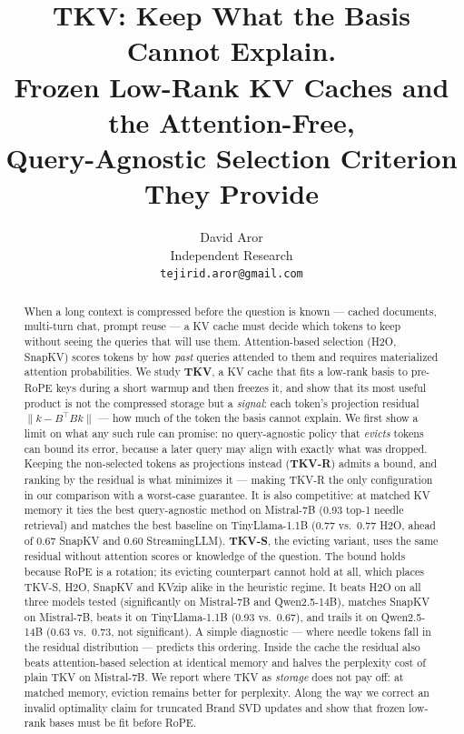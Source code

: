 \documentclass{article}
\title{\textbf{TKV: Keep What the Basis Cannot Explain.\\
Frozen Low-Rank KV Caches and the Attention-Free,\\
Query-Agnostic Selection Criterion They Provide}}
\author{
  David Aror \\
  Independent Research \\
  \texttt{tejirid.aror@gmail.com}
}
\date{}
\begin{document}
\ifcolmsubmission
\linenumbers
\fi

\maketitle

\begin{abstract}
When a long context is compressed before the question is known --- cached
documents, multi-turn chat, prompt reuse --- a KV cache must decide which
tokens to keep without seeing the queries that will use them. Attention-based
selection (H2O, SnapKV) scores tokens by how \emph{past} queries attended to
them and requires materialized attention probabilities. We study \textbf{TKV}, a KV cache that fits a low-rank basis to pre-RoPE keys
during a short warmup and then freezes it, and show that its most useful
product is not the compressed storage but a \emph{signal}: each token's
projection residual $\lVert k - B^\top B k\rVert$ --- how much of the token the
basis cannot explain. We first show a limit on what any such rule can promise:
no query-agnostic policy that \emph{evicts} tokens can bound its error, because
a later query may align with exactly what was dropped. Keeping the
non-selected tokens as projections instead (\textbf{TKV-R}) admits a bound, and
ranking by the residual is what minimizes it --- making TKV-R the only
configuration in our comparison with a worst-case guarantee. It is also
competitive: at matched KV memory it ties the best query-agnostic method on
Mistral-7B (0.93 top-1 needle retrieval) and matches the best baseline on
TinyLlama-1.1B (0.77 vs.\ 0.77 H2O, ahead of 0.67 SnapKV and 0.60 StreamingLLM).
\textbf{TKV-S}, the evicting variant, uses the same residual without attention
scores or knowledge of the question. The bound holds because RoPE is a rotation; its evicting counterpart cannot
hold at all, which places TKV-S, H2O, SnapKV and KVzip alike in the heuristic
regime. It beats H2O on all three models tested (significantly on Mistral-7B and
Qwen2.5-14B), matches SnapKV on Mistral-7B, beats it on TinyLlama-1.1B (0.93
vs.\ 0.67), and trails it on Qwen2.5-14B (0.63 vs.\ 0.73, not significant).
A simple diagnostic --- where needle tokens fall in the residual distribution
--- predicts this ordering. Inside the cache the residual also beats attention-based selection at identical
memory and halves the perplexity cost of plain TKV on Mistral-7B. We report
where TKV as \emph{storage} does not pay off: at matched memory, eviction
remains better for perplexity. Along the way we correct
an invalid optimality claim for truncated Brand SVD updates and show that
frozen low-rank bases must be fit before RoPE.
\end{abstract}
\end{document}
